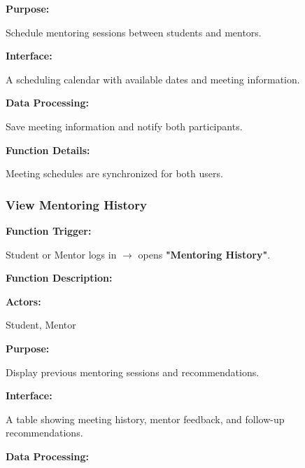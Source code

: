 \textbf{Purpose:}

Schedule mentoring sessions between students and mentors.

\vspace{0.2cm}

\textbf{Interface:}

A scheduling calendar with available dates and meeting information.

\vspace{0.2cm}

\textbf{Data Processing:}

Save meeting information and notify both participants.

\vspace{0.3cm}

\textbf{Function Details:}

Meeting schedules are synchronized for both users.



\subsubsection{View Mentoring History}

\textbf{Function Trigger:}

Student or Mentor logs in $\rightarrow$ opens \textbf{"Mentoring History"}.

\vspace{0.3cm}

\textbf{Function Description:}

\textbf{Actors:}

Student, Mentor

\vspace{0.2cm}

\textbf{Purpose:}

Display previous mentoring sessions and recommendations.

\vspace{0.2cm}

\textbf{Interface:}

A table showing meeting history, mentor feedback, and follow-up recommendations.

\vspace{0.2cm}

\textbf{Data Processing:}

